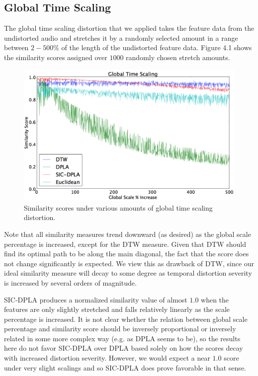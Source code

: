 \documentclass[a4paper,12pt]{report} 	%
\numberwithin{figure}{chapter}
\numberwithin{table}{chapter}
\numberwithin{equation}{chapter}
\begin{document}
\begin{flushleft}
\subsection{Global Time Scaling}
The global time scaling distortion that we applied takes the feature data from the undistorted audio and stretches it by a randomly selected amount in a range between $2-500\%$ of the length of the undistorted feature data. Figure 4.1 shows the similarity scores assigned over $1000$ randomly chosen stretch amounts.
\begin{figure}[h!]
\begin{center}
\includegraphics[scale=0.5,width=\linewidth]{GlobalTimeScaling}
\caption[Global Time Scaling Results]{Similarity scores under various amounts of global time scaling distortion.}
\end{center}
\end{figure}
Note that all similarity measures trend downward (as desired) as the global scale percentage is increased, except for the DTW measure. Given that DTW should find its optimal path to be along the main diagonal, the fact that the score does not change significantly is expected. We view this as drawback of DTW, since our ideal similarity measure will decay to some degree as temporal distortion severity is increased by several orders of magnitude.

SIC-DPLA produces a normalized similarity value of almost $1.0$ when the features are only slightly stretched and falls relatively linearly as the scale percentage is increased. It is not clear whether the relation between global scale percentage and similarity score should be inversely proportional or inversely related in some more complex way (e.g. as DPLA seems to be), so the results here do not favor SIC-DPLA over DPLA based solely on how the scores decay with increased distortion severity. However, we would expect a near $1.0$ score under very slight scalings and so SIC-DPLA does prove favorable in that sense.


\end{flushleft}
\end{document}
